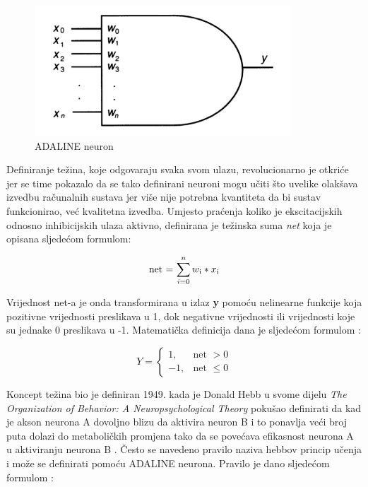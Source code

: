 \documentclass[times, utf8, zavrsni]{fer}
\begin{document}
\begin{figure}[H]
    \centering
    \includegraphics{img/adaline-neuron.png}
    \caption[Caption for LOF]{ADALINE neuron\footnotemark}
    \label{fig:adaline-neuron}
\end{figure}

Definiranje težina, koje odgovaraju svaka svom ulazu, revolucionarno je otkriće jer se time pokazalo da se tako definirani neuroni mogu učiti što uvelike olakšava izvedbu računalnih sustava jer više nije potrebna kvantiteta da bi sustav funkcionirao, već kvalitetna izvedba. Umjesto praćenja koliko je ekscitacijskih odnosno inhibicijskih ulaza aktivno, definirana je težinska suma \textit{net} koja je opisana sljedećom formulom:

\begin{equation}
    \label{net:eq}
    \text{net = $\sum\limits_{i=0}^n w\textsubscript{i} * x\textsubscript{i}$}
\end{equation}

Vrijednost net-a je onda transformirana u izlaz \textbf{y} pomoću nelinearne funkcije koja pozitivne vrijednosti preslikava u 1, dok negativne vrijednosti ili vrijednosti koje su jednake 0 preslikava u -1. Matematička definicija dana je sljedećom formulom \citep{picton2000}:

\begin{equation}
\label{step:eq}
    Y = 
    \begin{cases}
        1, & \text{net $>0$} \\
        -1, & \text{net $\leq 0$}
    \end{cases}
\end{equation}

\bigskip

Koncept težina bio je definiran 1949. kada je Donald Hebb u svome dijelu \textit{The Organization of Behavior: A Neuropsychological Theory} pokušao definirati da kad je akson neurona A dovoljno blizu da aktivira neuron B i to ponavlja veći broj puta dolazi do metaboličkih promjena tako da se povećava efikasnost neurona A u aktiviranju neurona B \citep{hebb}. Često se navedeno pravilo naziva hebbov princip učenja i može se definirati pomoću ADALINE neurona. Pravilo je dano sljedećom formulom \citep{picton2000}:
\end{document}
